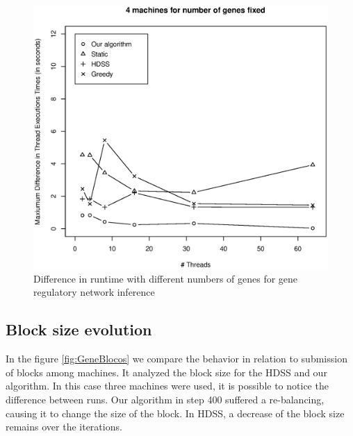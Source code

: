 \documentclass[journal]{IEEEtran}
\begin{document}
\begin{figure}[htb]
	\begin{center}
	\centering
			\includegraphics[scale=0.4]{Maxima_Diferenca_Fabrizio.eps}
	\caption{Difference in runtime with different numbers of genes for gene regulatory network inference}
	\label{fig:GeneDiferenca}
	\end{center}
\end{figure}

\subsection{Block size evolution}

In the figure \ref{fig:GeneBlocos} we compare the behavior in relation to
submission of blocks among machines. It analyzed the block size for the HDSS and
our algorithm. In this case three machines were used, it is possible to notice
the difference between runs. Our algorithm in step 400 suffered a re-balancing,
causing it to change the size of the block. In HDSS, a decrease of the block
size remains over the iterations.
\end{document}
